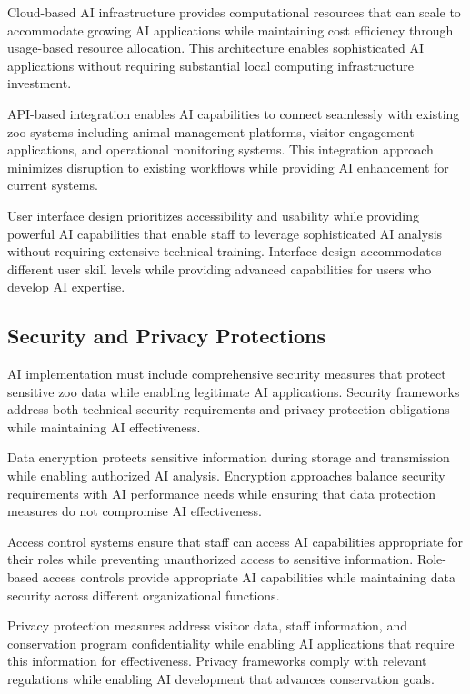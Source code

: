 \documentclass[
  Letterpaper,
]{scrbook}
\begin{document}
Cloud-based AI infrastructure provides computational resources that can
scale to accommodate growing AI applications while maintaining cost
efficiency through usage-based resource allocation. This architecture
enables sophisticated AI applications without requiring substantial
local computing infrastructure investment.

API-based integration enables AI capabilities to connect seamlessly with
existing zoo systems including animal management platforms, visitor
engagement applications, and operational monitoring systems. This
integration approach minimizes disruption to existing workflows while
providing AI enhancement for current systems.

User interface design prioritizes accessibility and usability while
providing powerful AI capabilities that enable staff to leverage
sophisticated AI analysis without requiring extensive technical
training. Interface design accommodates different user skill levels
while providing advanced capabilities for users who develop AI
expertise.

\subsection{Security and Privacy
Protections}\label{security-and-privacy-protections}

AI implementation must include comprehensive security measures that
protect sensitive zoo data while enabling legitimate AI applications.
Security frameworks address both technical security requirements and
privacy protection obligations while maintaining AI effectiveness.

Data encryption protects sensitive information during storage and
transmission while enabling authorized AI analysis. Encryption
approaches balance security requirements with AI performance needs while
ensuring that data protection measures do not compromise AI
effectiveness.

Access control systems ensure that staff can access AI capabilities
appropriate for their roles while preventing unauthorized access to
sensitive information. Role-based access controls provide appropriate AI
capabilities while maintaining data security across different
organizational functions.

Privacy protection measures address visitor data, staff information, and
conservation program confidentiality while enabling AI applications that
require this information for effectiveness. Privacy frameworks comply
with relevant regulations while enabling AI development that advances
conservation goals.
\end{document}
